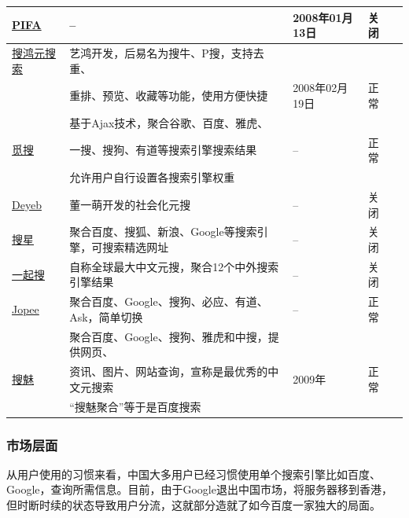 \begin{table}[htbp]
\begin{tabular}{|l|l|l|l|l|}
    \hline
    \href{http://www.pifa.us/}{PIFA} &  -- & 2008年01月13日 & 关闭\\
    \hline
    \href{http://www.sohong.cn/}{搜鸿元搜索} &  艺鸿开发，后易名为搜牛、P搜，支持去重、 &&\\
        & 重排、预览、收藏等功能，使用方便快捷 & 2008年02月19日 & 正常\\
    \hline
        & 基于Ajax技术，聚合谷歌、百度、雅虎、&&\\
    \href{http://www.metasoo.cn/}{觅搜} & 一搜、搜狗、有道等搜索引擎搜索结果 & -- & 正常\\
        & 允许用户自行设置各搜索引擎权重 & & \\
    \hline
    \href{http://www.deyeb.com/}{Deyeb} &  董一萌开发的社会化元搜 & -- & 关闭\\
    \hline
    \href{http://www.soseen.com/}{搜星} &  聚合百度、搜狐、新浪、Google等搜索引擎，可搜索精选网址 & -- & 关闭\\
    \hline
    \href{http://www.1qiso.com/}{一起搜} &  自称全球最大中文元搜，聚合12个中外搜索引擎结果 & -- & 关闭\\
    \hline
    \href{http://www.jopee.cn/}{Jopee} &  聚合百度、Google、搜狗、必应、有道、Ask，简单切换 & -- & 正常\\
    \hline
        & 聚合百度、Google、搜狗、雅虎和中搜，提供网页、 & &\\
    \href{http://www.someta.com/}{搜魅} & 资讯、图片、网站查询，宣称是最优秀的中文元搜索 & 2009年 & 正常\\
        & “搜魅聚合”等于是百度搜索 & & \\
  \hline
\end{tabular}
\end{table}

\subsubsection{市场层面}
从用户使用的习惯来看，中国大多用户已经习惯使用单个搜索引擎比如百度、Google，查询所需信息。目前，由于Google退出中国市场，将服务器移到香港，但时断时续的状态导致用户分流，这就部分造就了如今百度一家独大的局面。

